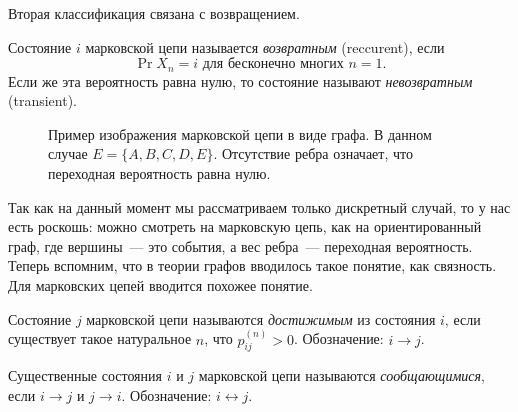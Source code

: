 Вторая классификация связана с возвращением. 
\begin{definition}
	Состояние \(i\) марковской цепи называется \emph{возвратным} (reccurent), 
	если 
	\[
		\Pr{X_{n} = i \text{ для бесконечно многих }n} = 1.
	\]
	Если же эта вероятность равна нулю, то состояние называют 
	\emph{невозвратным} (transient).
\end{definition}

\begin{wrapfigure}[13]{r}{0.5\textwidth}
	\begin{center}
		\begin{center}
		\end{center}
	\end{center}
	\caption{Пример изображения марковской цепи в виде графа. В данном случае 
	\(E = \{A, B, C, D, E\}\). Отсутствие ребра означает, что переходная 
	вероятность равна нулю.}
\end{wrapfigure}

Так как на данный момент мы рассматриваем только дискретный случай, то у нас 
есть роскошь: можно смотреть на марковскую цепь, как на ориентированный граф, 
где вершины~--- это события, а вес ребра~--- переходная вероятность. Теперь 
вспомним, что в теории графов вводилось такое понятие, как связность. Для 
марковских цепей вводится похожее понятие.
\begin{definition}
	Состояние \(j\) марковской цепи называются \emph{достижимым} из состояния 
	\(i\), если существует такое натуральное \(n\), что \(p_{ij}^{(n)} > 0\). 
	Обозначение: \(i \to j\).
\end{definition}
\begin{definition}
	Существенные состояния \(i\) и \(j\) марковской цепи называются 
	\emph{сообщающимися}, если \(i \to j\) и \(j \to i\). Обозначение: \(i 
	\leftrightarrow j\).
\end{definition}

